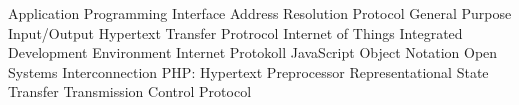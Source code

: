 \begin{acronym}[Bash]
  {Application Programming Interface}
  {Address Resolution Protocol}
  {General Purpose Input/Output}
  {Hypertext Transfer Protrocol}
  {Internet of Things}
  {Integrated Development Environment}
  {Internet Protokoll}
  {JavaScript Object Notation}
  {Open Systems Interconnection}
  {PHP: Hypertext Preprocessor}
  {Representational State Transfer}
  {Transmission Control Protocol}
\end{acronym}
